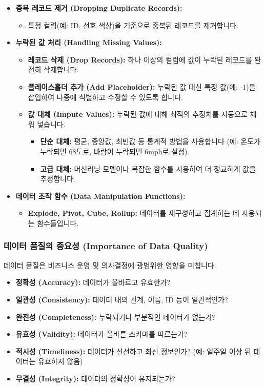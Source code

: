 \documentclass[11pt,a4paper]{article}
\begin{document}
\begin{enumerate}
\begin{itemize}
    \item \textbf{중복 레코드 제거 (Dropping Duplicate Records):}
    \begin{itemize}
        \item 특정 컬럼(예: ID, 선호 색상)을 기준으로 중복된 레코드를 제거합니다.
    \end{itemize}
    \item \textbf{누락된 값 처리 (Handling Missing Values):}
    \begin{itemize}
        \item \textbf{레코드 삭제 (Drop Records):} 하나 이상의 컬럼에 값이 누락된 레코드를 완전히 삭제합니다.
        \item \textbf{플레이스홀더 추가 (Add Placeholder):} 누락된 값 대신 특정 값(예: -1)을 삽입하여 나중에 식별하고 수정할 수 있도록 합니다.
        \item \textbf{값 대체 (Impute Values):} 누락된 값에 대해 최적의 추정치를 자동으로 채워 넣습니다.
        \begin{itemize}
            \item \textbf{단순 대체:} 평균, 중앙값, 최빈값 등 통계적 방법을 사용합니다 (예: 온도가 누락되면 68도로, 바람이 누락되면 6mph로 설정).
            \item \textbf{고급 대체:} 머신러닝 모델이나 복잡한 함수를 사용하여 더 정교하게 값을 추정합니다.
        \end{itemize}
    \end{itemize}
    \item \textbf{데이터 조작 함수 (Data Manipulation Functions):}
    \begin{itemize}
        \item \textbf{Explode, Pivot, Cube, Rollup:} 데이터를 재구성하고 집계하는 데 사용되는 함수들입니다.
    \end{itemize}
\end{itemize}

\subsubsection{데이터 품질의 중요성 (Importance of Data Quality)}
데이터 품질은 비즈니스 운영 및 의사결정에 광범위한 영향을 미칩니다.

\begin{itemize}
    \item \textbf{정확성 (Accuracy):} 데이터가 올바르고 유효한가?
    \item \textbf{일관성 (Consistency):} 데이터 내의 관계, 이름, ID 등이 일관적인가?
    \item \textbf{완전성 (Completeness):} 누락되거나 부분적인 데이터가 없는가?
    \item \textbf{유효성 (Validity):} 데이터가 올바른 스키마를 따르는가?
    \item \textbf{적시성 (Timeliness):} 데이터가 신선하고 최신 정보인가? (예: 일주일 이상 된 데이터는 유효하지 않음)
    \item \textbf{무결성 (Integrity):} 데이터의 정확성이 유지되는가?
\end{itemize}


\end{enumerate}
\end{document}
